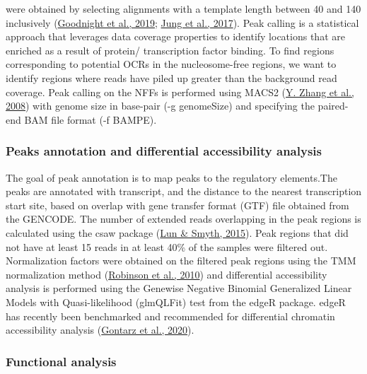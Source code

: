 \documentclass[12pt,twoside]{reedthesis}
\begin{document}
were obtained by selecting alignments with a template length between 40
and 140 inclusively (\protect\hyperlink{ref-goodnight2019}{Goodnight et al., 2019}; \protect\hyperlink{ref-jung2017}{Jung et al., 2017}). Peak calling is a
statistical approach that leverages data coverage properties to identify
locations that are enriched as a result of protein/ transcription factor
binding. To find regions corresponding to potential OCRs in the
nucleosome-free regions, we want to identify regions where reads have
piled up greater than the background read coverage. Peak calling on the
NFFs is performed using MACS2 (\protect\hyperlink{ref-zhang2008}{Y. Zhang et al., 2008}) with genome size in base-pair
(-g genomeSize) and specifying the paired-end BAM file format (-f
BAMPE).

\hypertarget{m3.3.2}{%
\subsubsection*{Peaks annotation and differential accessibility analysis}\label{m3.3.2}}

The goal of peak annotation is to map peaks to the regulatory
elements.The peaks are annotated with transcript, and the distance to
the nearest transcription start site, based on overlap with gene
transfer format (GTF) file obtained from the GENCODE. The number of
extended reads overlapping in the peak regions is calculated using the
csaw package (\protect\hyperlink{ref-lun2015}{Lun \& Smyth, 2015}). Peak regions that did not have at least 15
reads in at least 40\% of the samples were filtered out. Normalization
factors were obtained on the filtered peak regions using the TMM
normalization method (\protect\hyperlink{ref-robinson2010}{Robinson et al., 2010}) and differential accessibility
analysis is performed using the Genewise Negative Binomial Generalized
Linear Models with Quasi-likelihood (glmQLFit) test from the edgeR
package. edgeR has recently been benchmarked and
recommended for differential chromatin accessibility analysis
(\protect\hyperlink{ref-gontarz2020}{Gontarz et al., 2020}).

\hypertarget{m3.3.3}{%
\subsubsection*{Functional analysis}\label{m3.3.3}}
\end{document}
